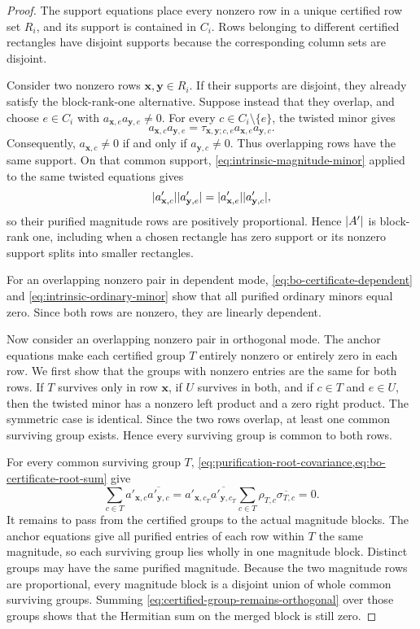 \documentclass[11pt,letterpaper,onecolumn]{article}
\theoremstyle{plain}
\theoremstyle{definition}
\theoremstyle{remark}
\DeclarePairedDelimiter{\abs}{\lvert}{\rvert}
\begin{document}
\begin{proof}
The support equations place every nonzero row in a unique certified row
set $R_i$, and its
support is contained in $C_i$.  Rows belonging to different certified
rectangles have disjoint supports because the corresponding column sets are
disjoint.

Consider two nonzero rows $\mathbf x,\mathbf y\in R_i$.  If their supports
are disjoint, they already satisfy the block-rank-one alternative.  Suppose
instead that they overlap, and choose $e\in C_i$ with
$a_{\mathbf x,e}a_{\mathbf y,e}\ne0$.  For every $c\in C_i\setminus\{e\}$,
the twisted minor gives
\[
  a_{\mathbf x,c}a_{\mathbf y,e}
  =\tau_{\mathbf x,\mathbf y;c,e}
   a_{\mathbf x,e}a_{\mathbf y,c}.
\]
Consequently,
$a_{\mathbf x,c}\ne0$ if and only if $a_{\mathbf y,c}\ne0$.
Thus overlapping rows have the same support.  On that common support,
\eqref{eq:intrinsic-magnitude-minor} applied to the same twisted equations
gives
\[
  \abs{a'_{\mathbf x,c}}\abs{a'_{\mathbf y,e}}
  =\abs{a'_{\mathbf x,e}}\abs{a'_{\mathbf y,c}},
\]
so their purified magnitude rows are positively proportional.  Hence
$\abs{A'}$ is block-rank one, including when a chosen rectangle has zero
support or its nonzero support splits into smaller rectangles.

For an overlapping nonzero pair in dependent mode,
\eqref{eq:bo-certificate-dependent} and
\eqref{eq:intrinsic-ordinary-minor} show that all purified ordinary minors
equal zero.  Since both rows are nonzero, they are linearly dependent.

Now consider an overlapping nonzero pair in orthogonal mode.  The anchor
equations make each certified group $T$ entirely nonzero or entirely zero
in each row.  We first show that the groups with nonzero entries are the
same for both rows.  If $T$ survives only in row
$\mathbf x$, if $U$ survives in both, and if $c\in T$ and $e\in U$, then the
twisted minor has a nonzero left product and a zero right product.  The
symmetric case is identical.  Since the two rows overlap, at least one
common surviving group exists. Hence every surviving group is common to
both rows.

For every common surviving group $T$,
\cref{eq:purification-root-covariance,eq:bo-certificate-root-sum} give
\begin{equation}
  \sum_{c\in T}a'_{\mathbf x,c}\overline{a'_{\mathbf y,c}}
  =a'_{\mathbf x,c_T}\overline{a'_{\mathbf y,c_T}}
    \sum_{c\in T}\rho_{T,c}\overline{\sigma_{T,c}}=0.
  \label{eq:certified-group-remains-orthogonal}
\end{equation}
It remains to pass from the certified groups to the actual magnitude
blocks.  The anchor equations give all purified entries of each row within
$T$ the same magnitude, so each surviving group lies wholly in one
magnitude block.  Distinct groups may have the same purified magnitude.
Because the two magnitude rows are proportional, every magnitude block is
a disjoint union of whole common surviving groups.  Summing
\eqref{eq:certified-group-remains-orthogonal} over those groups shows that
the Hermitian sum on the merged block is still zero.


\end{proof}
\end{document}
